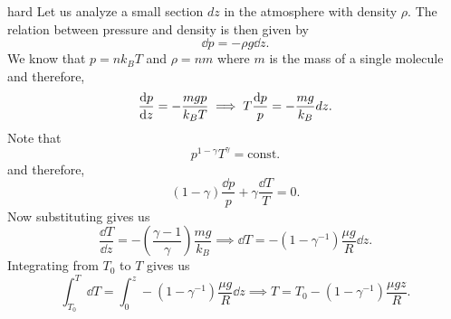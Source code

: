\begin{solution}{hard}
Let us analyze a small section $dz$ in the atmosphere with density $\rho$. The relation between pressure and density is then given by 
\[\dd p = - \rho g \dd z.\]
We know that $p = n k_B T$ and $\rho = nm$ where $m$ is the mass of a single molecule and therefore, 
\[\dv{p}{z} = - \frac{mg p}{k_B T}\implies T \frac{\dd p}{p} = - \frac{mg}{k_B}dz.\]
Note that 
\[p^{1 - \gamma} T^{\gamma} = \text{const.}\]
and therefore, 
\[(1 - \gamma) \frac{\dd p}{p} + \gamma \frac{\dd T}{T} = 0.\]
Now substituting gives us 
\[\frac{\dd T}{\dd z} = -\left(\frac{\gamma - 1}{\gamma}\right) \frac{mg}{k_B} \implies \dd T =  -(1 - \gamma^{-1}) \frac{\mu g}{R}\dd z.\]
Integrating from $T_0$ to $T$ gives us 
\[\int_{T_0}^{T} \dd T = \int_{0}^{z} -(1 - \gamma^{-1}) \frac{\mu g}{R}\dd z \implies \boxed{T = T_0 - (1 - \gamma^{-1}) \frac{\mu g z}{R}}.\]

\end{solution}